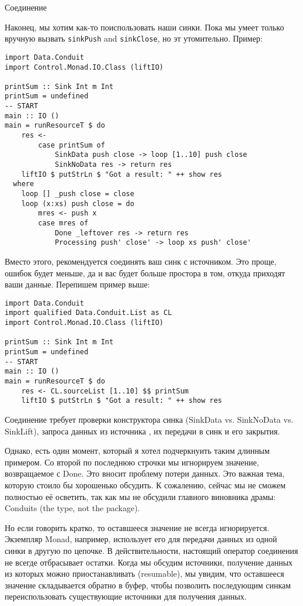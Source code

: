 Соединение

Наконец, мы хотим как-то поиспользовать наши синки. Пока мы умеет только вручную вызвать
\verb*|sinkPush| and \verb*|sinkClose|, но эт утомительно. Пример:
\begin{lstlisting}
import Data.Conduit
import Control.Monad.IO.Class (liftIO)

printSum :: Sink Int m Int
printSum = undefined
-- START
main :: IO ()
main = runResourceT $ do
    res <-
        case printSum of
            SinkData push close -> loop [1..10] push close
            SinkNoData res -> return res
    liftIO $ putStrLn $ "Got a result: " ++ show res
  where
    loop [] _push close = close
    loop (x:xs) push close = do
        mres <- push x
        case mres of
            Done _leftover res -> return res
            Processing push' close' -> loop xs push' close'
\end{lstlisting}
Вместо этого, рекомендуется соединять ваш синк с источником. Это проще, 
ошибок будет меньше, да и вас будет больше простора в том, откуда приходят ваши данные.
Перепишем пример выше:
\begin{lstlisting}
import Data.Conduit
import qualified Data.Conduit.List as CL
import Control.Monad.IO.Class (liftIO)

printSum :: Sink Int m Int
printSum = undefined
-- START
main :: IO ()
main = runResourceT $ do
    res <- CL.sourceList [1..10] $$ printSum
    liftIO $ putStrLn $ "Got a result: " ++ show res
\end{lstlisting}

Соединение требует проверки конструктора синка (SinkData vs. 
SinkNoData vs. SinkLift), запроса данных из источника , их передачи в синк и его закрытия.

Однако, есть один момент, который я хотел подчеркнуить таким длинным примером. Со второй
по последнюю строчки мы игнорируем значение, возвращаемое с Done. Это вносит проблему
потери данных. Это важная тема, которую стоило бы хорошенько обсудить. К сожалению,
сейчас мы не сможем полностью её осветить, так как мы не обсудили главного виновника
драмы: Conduits (the type, not the package). %

Но если говорить кратко, то оставшееся значение не всегда игнорируется. Экземпляр Monad,
например, использует его для передачи данных из одной синки в другую по цепочке.
В действительности, настоящий оператор соединения не всегде отбрасывает остатки. Когда мы
обсудим источники, получение данных из которых можно приостанавливать (resumable), мы
увидим, что оставшееся значение складывается обратно в буфер, чтобы позволить последующим
синкам переиспользовать существующие источники для получения данных.

